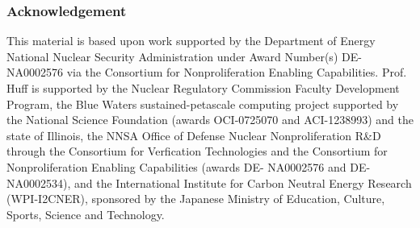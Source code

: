 \begin{frame}
	\frametitle{Acknowledgement}
	This material is based upon work supported by
	the Department of Energy National Nuclear Security
	Administration under Award Number(s) DE-NA0002576 via
	the Consortium for Nonproliferation Enabling Capabilities.
	\newline
	\newline
	Prof. Huff is supported by the Nuclear Regulatory
	Commission Faculty Development Program, the Blue Waters
	sustained-petascale computing project supported by the
	National Science Foundation (awards OCI-0725070 and
	ACI-1238993) and the state of Illinois, the NNSA Office
	of Defense Nuclear Nonproliferation R\&D through the
	Consortium for Verfication Technologies and the Consortium
	for Nonproliferation Enabling Capabilities (awards DE-
	NA0002576 and DE-NA0002534), and the International
	Institute for Carbon Neutral Energy Research (WPI-I2CNER),
	sponsored by the Japanese Ministry of Education, Culture,
	Sports, Science and Technology.
\end{frame}
